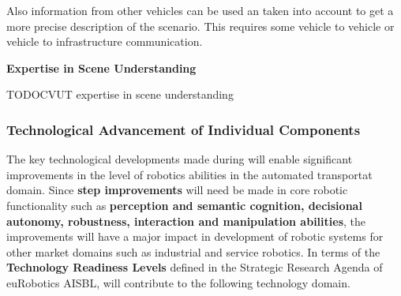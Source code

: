 Also information from other vehicles can be used an taken into account to get a more precise description of the scenario. This requires some vehicle to vehicle or vehicle to infrastructure communication. 

{\bf Expertise in Scene Understanding} 

TODOCVUT expertise in scene understanding





\subsubsection{Technological Advancement of Individual Components}
\label{sec:trl}
The key technological developments made during \Project{} will enable significant improvements in the level of robotics abilities in the automated transportat domain. Since \textbf{step improvements} will need be made in core robotic functionality such as \textbf{perception and semantic cognition, decisional autonomy, robustness, interaction and manipulation abilities}, the improvements will have a major impact in development of robotic systems for other market domains such as industrial and service robotics. In terms of the \textbf{Technology Readiness Levels} defined in the Strategic Research Agenda of euRobotics AISBL, \Project{} will contribute to the following technology domain.


%
%
%
%


